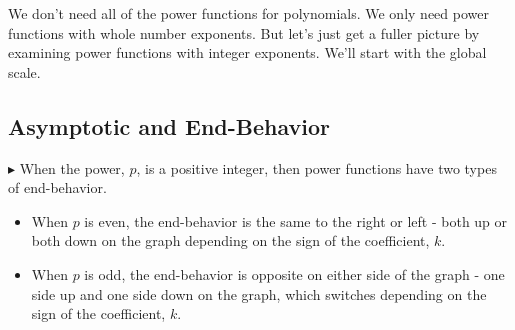 \documentclass{ximera}
\begin{document}
We don't need all of the power functions for polynomials.  We only need power functions with whole number exponents. But let's just get a fuller picture by examining power functions with integer exponents. We'll start with the global scale.\\





\subsection{Asymptotic and End-Behavior}



$\blacktriangleright$  When the power, $p$, is a positive integer, then power functions have two types of end-behavior.

\begin{itemize}
\item When $p$ is even, the end-behavior is the same to the right or left - both up or both down on the graph depending on the sign of the coefficient, $k$.
\item When $p$ is odd, the end-behavior is opposite on either side of the graph - one side up and one side down on the graph, which switches depending on the sign of the coefficient, $k$.
\end{itemize}
\end{document}
